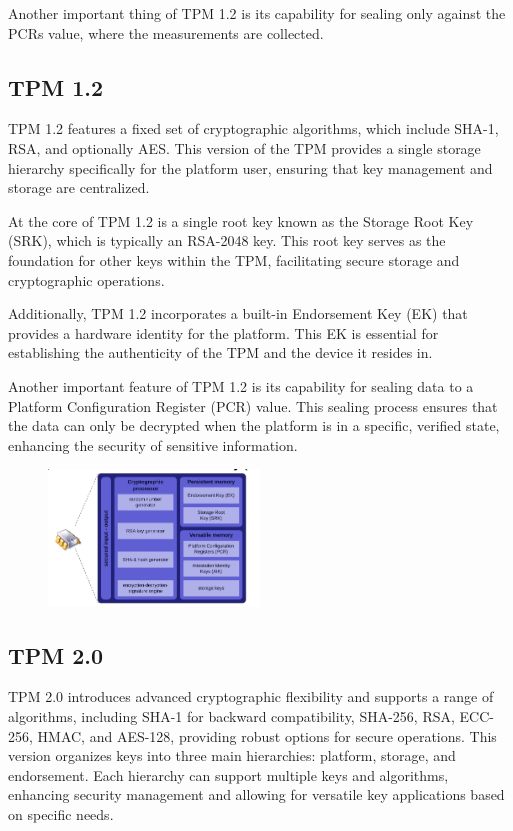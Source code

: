 Another important thing of TPM 1.2 is its capability for sealing
only against the PCRs value, where the measurements are collected. 
\subsection{TPM 1.2}

TPM 1.2 features a fixed set of cryptographic algorithms, which
include SHA-1, RSA, and optionally AES. This version of the TPM
provides a single storage hierarchy specifically for the platform
user, ensuring that key management and storage are centralized.

At the core of TPM 1.2 is a single root key known as the Storage Root
Key (SRK), which is typically an RSA-2048 key. This root key serves as
the foundation for other keys within the TPM, facilitating secure
storage and cryptographic operations.

Additionally, TPM 1.2 incorporates a built-in Endorsement Key (EK)
that provides a hardware identity for the platform. This EK is
essential for establishing the authenticity of the TPM and the device
it resides in. 

Another important feature of TPM 1.2 is its capability for sealing
data to a Platform Configuration Register (PCR) value. This sealing
process ensures that the data can only be decrypted when the platform
is in a specific, verified state, enhancing the security of sensitive
information.
\begin{figure}
  \centering
  \includegraphics[width=0.5\textwidth]{img/TMP 1-2.png}
  \label{fig:tpm 1.2}
\end{figure}

\subsection{TPM 2.0}

TPM 2.0 introduces advanced cryptographic flexibility and supports a
range of algorithms, including SHA-1 for backward compatibility,
SHA-256, RSA, ECC-256, HMAC, and AES-128, providing robust options for
secure operations. This version organizes keys into three main
hierarchies: platform, storage, and endorsement. Each hierarchy can
support multiple keys and algorithms, enhancing security management
and allowing for versatile key applications based on specific needs.

